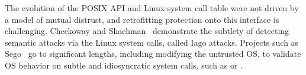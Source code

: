 

The evolution of the POSIX API and Linux system call table
were not driven by a model of mutual distrust, and retrofitting
protection onto this interface is challenging.
Checkoway and Shachman~\cite{checkoway13iago} demonstrate 
the subtlety of detecting semantic attacks via the Linux system calls,
called Iago attacks.
Projects such as Sego~\cite{kwon2016sego} go to significant lengths, including
modifying the untrusted OS, to validate OS behavior on subtle and idiosyncratic
system calls, such as  or .


